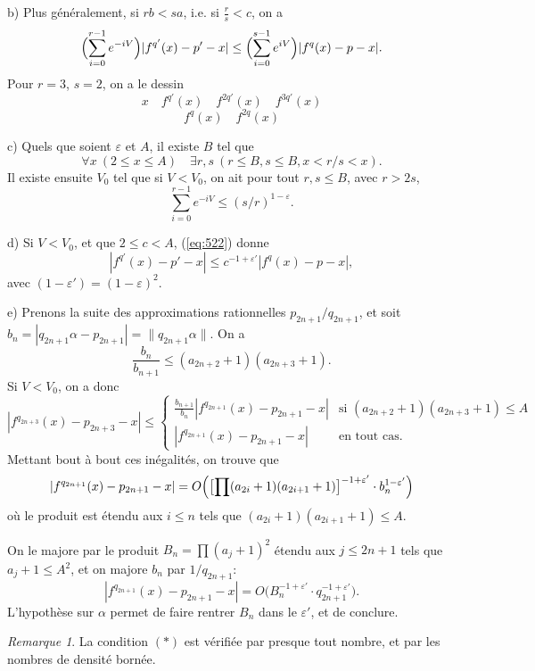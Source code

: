 \documentclass[12pt]{amsart}
\theoremstyle{plain}
\theoremstyle{remark}
\newtheorem{remarque}[theoreme]{Remarque}
\begin{document}
b) Plus g\'{e}n\'{e}ralement, si $rb < sa$, i.e. si $\frac{r}{s} < c$, on a
\begin{equation}\label{eq:522}
\Bigl(\sum_{i=0}^{r-1} e^{-iV}\Bigr)|f^{q'}(x) - p' - x| \leq \Bigl(\sum_{i=0}^{s-1} e^{iV}\Bigr)|f^{q}(x) - p - x| .
\end{equation}
Pour $r = 3$, $s = 2$, on a le dessin
\[
x \quad f^{q'}(x) \quad f^{2q'}(x) \quad f^{3q'}(x)
\]
\[
f^{q}(x) \quad f^{2q}(x)
\]

c) Quels que soient $\varepsilon$ et $A$, il existe $B$ tel que
\[
\forall x \ (2 \leq x \leq A) \quad \exists r, s \ (r \leq B, s \leq B, x < r/s < x) .
\]
Il existe ensuite $V_{0}$ tel que si $V < V_{0}$, on ait pour tout $r, s \leq B$, avec $r > 2s$,
\[
\sum_{i=0}^{r-1} e^{-iV} \leq (s/r)^{1-\varepsilon} .
\]

d) Si $V < V_{0}$, et que $2 \leq c < A$, (\ref{eq:522}) donne
\begin{equation}\label{eq:522b}
|f^{q'}(x) - p' - x| \leq c^{-1+\varepsilon'}|f^{q}(x) - p - x| ,
\end{equation}
avec $(1-\varepsilon') = (1-\varepsilon)^{2}$.

e) Prenons la suite des approximations rationnelles $p_{2n+1}/q_{2n+1}$, et soit $b_{n} = |q_{2n+1}\alpha - p_{2n+1}| = \|q_{2n+1}\alpha\|$. On a
\[
\frac{b_{n}}{b_{n+1}} \leq (a_{2n+2} + 1)(a_{2n+3} + 1) .
\]
Si $V < V_{0}$, on a donc
\[
|f^{q_{2n+3}}(x) - p_{2n+3} - x| \leq
\begin{cases}
\frac{b_{n+1}}{b_{n}}|f^{q_{2n+1}}(x) - p_{2n+1} - x| & \text{si } (a_{2n+2} + 1)(a_{2n+3} + 1) \leq A \\
|f^{q_{2n+1}}(x) - p_{2n+1} - x| & \text{en tout cas.}
\end{cases}
\]
Mettant bout \`{a} bout ces in\'{e}galit\'{e}s, on trouve que
\[
|f^{q_{2n+1}}(x) - p_{2n+1} - x| = O\Bigl(\bigl[\prod (a_{2i} + 1)(a_{2i+1} + 1)\bigr]^{-1+\varepsilon'} \cdot b_{n}^{1-\varepsilon'}\Bigr)
\]
o\`{u} le produit est \'{e}tendu aux $i \leq n$ tels que $(a_{2i} + 1)(a_{2i+1} + 1) \leq A$.

On le majore par le produit $B_{n} = \prod (a_{j} + 1)^{2}$ \'{e}tendu aux $j \leq 2n+1$ tels que $a_{j} + 1 \leq A^{2}$, et on majore $b_{n}$ par $1/q_{2n+1}$:
\[
|f^{q_{2n+1}}(x) - p_{2n+1} - x| = O\bigl(B_{n}^{-1+\varepsilon'} \cdot q_{2n+1}^{-1+\varepsilon'}\bigr) .
\]
L'hypoth\`{e}se sur $\alpha$ permet de faire rentrer $B_{n}$ dans le $\varepsilon'$, et de conclure.

\begin{remarque}\label{rem:53}
La condition $(*)$ est v\'{e}rifi\'{e}e par presque tout nombre, et par les nombres de densit\'{e} born\'{e}e.
\end{remarque}
\end{document}
